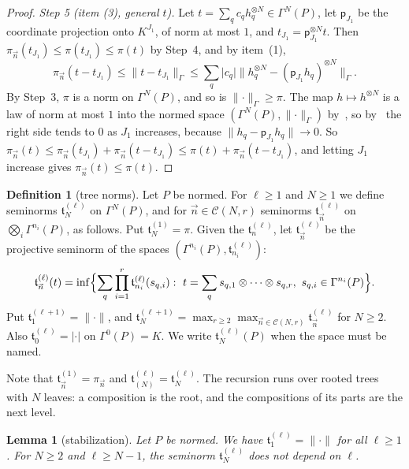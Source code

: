 \documentclass[11pt]{amsart}
\newtheorem{lemma}[theorem]{Lemma}
\theoremstyle{definition}
\newtheorem{definition}[theorem]{Definition}
\theoremstyle{remark}
\numberwithin{equation}{section}
\newcommand{\abs}[1]{\lvert #1\rvert}
\newcommand{\norm}[1]{\lVert #1\rVert}
\theoremstyle{plain}
\theoremstyle{definition}
\theoremstyle{plain}
\begin{document}
\begin{proof}
\emph{Step 5 (item (3), general $t$).} Let $t=\sum_qc_qh_q^{\otimes N}\in\Gamma^N(P)$, let $\mathsf p_{J_1}$ be the coordinate projection onto $K^{J_1}$, of norm at most $1$, and $t_{J_1}=\mathsf p_{J_1}^{\otimes N}t$. Then $\pi_{\vec n}(t_{J_1})\le\pi(t_{J_1})\le\pi(t)$ by Step~4, and by item~(1),
\[
 \pi_{\vec n}(t-t_{J_1})\le\norm{t-t_{J_1}}_\Gamma\le\sum_q\abs{c_q}\norm{h_q^{\otimes N}-(\mathsf p_{J_1}h_q)^{\otimes N}}_\Gamma.
\]
By Step~3, $\pi$ is a norm on $\Gamma^N(P)$, and so is $\norm\cdot_\Gamma\ge\pi$. The map $h\mapsto h^{\otimes N}$ is a law of norm at most $1$ into the normed space $(\Gamma^N(P),\norm\cdot_\Gamma)$ by~\cite[Lemma~Q.1(2)]{I}, so by~\cite[(Q.3)]{I} the right side tends to $0$ as $J_1$ increases, because $\norm{h_q-\mathsf p_{J_1}h_q}\to0$. So $\pi_{\vec n}(t)\le\pi_{\vec n}(t_{J_1})+\pi_{\vec n}(t-t_{J_1})\le\pi(t)+\pi_{\vec n}(t-t_{J_1})$, and letting $J_1$ increase gives $\pi_{\vec n}(t)\le\pi(t)$.
\end{proof}

\begin{definition}[tree norms]\label{dp:def:tree}
Let $P$ be normed. For $\ell\ge1$ and $N\ge1$ we define seminorms $\mathfrak t^{(\ell)}_N$ on $\Gamma^N(P)$, and for $\vec n\in\mathcal C(N,r)$ seminorms $\mathfrak t^{(\ell)}_{\vec n}$ on $\bigotimes_i\Gamma^{n_i}(P)$, as follows. Put $\mathfrak t^{(1)}_N=\pi$. Given the $\mathfrak t^{(\ell)}_n$, let $\mathfrak t^{(\ell)}_{\vec n}$ be the projective seminorm of the spaces $(\Gamma^{n_i}(P),\mathfrak t^{(\ell)}_{n_i})$:
\begin{equation}\label{dp:eq:tree-root}
 \mathfrak t^{(\ell)}_{\vec n}(t)=\inf\Bigl\{\sum_q\prod_{i=1}^r\mathfrak t^{(\ell)}_{n_i}(s_{q,i}):\ t=\sum_qs_{q,1}\otimes\dots\otimes s_{q,r},\ s_{q,i}\in\Gamma^{n_i}(P)\Bigr\}.
\end{equation}
Put $\mathfrak t^{(\ell+1)}_1=\norm\cdot$, and $\mathfrak t^{(\ell+1)}_N=\max_{r\ge2}\max_{\vec n\in\mathcal C(N,r)}\mathfrak t^{(\ell)}_{\vec n}$ for $N\ge2$. Also $\mathfrak t^{(\ell)}_0=\abs\cdot$ on $\Gamma^0(P)=K$. We write $\mathfrak t^{(\ell)}_N(P)$ when the space must be named.
\end{definition}

Note that $\mathfrak t^{(1)}_{\vec n}=\pi_{\vec n}$ and $\mathfrak t^{(\ell)}_{(N)}=\mathfrak t^{(\ell)}_N$. The recursion runs over rooted trees with $N$ leaves: a composition is the root, and the compositions of its parts are the next level.

\begin{lemma}[stabilization]\label{dp:lem:tree-stable}
Let $P$ be normed. We have $\mathfrak t^{(\ell)}_1=\norm\cdot$ for all $\ell\ge1$. For $N\ge2$ and $\ell\ge N-1$, the seminorm $\mathfrak t^{(\ell)}_N$ does not depend on $\ell$.
\end{lemma}
\end{document}
